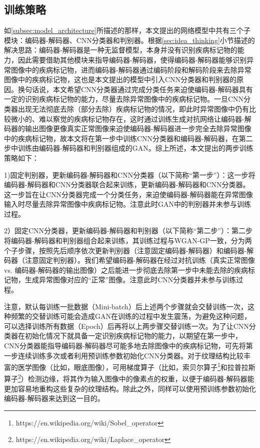 \subsection{训练策略}\label{subsec:traing_stragies}
如\ref{subsec:model_architecture}所描述的那样，本文提出的网络模型中共有三个子模块：编码器-解码器、CNN分类器和判别器。根据\ref{sec:idea_thinking}小节描述的解决思路：编码器-解码器是一种无监督模型，本身并没有识别疾病标记物的能力，因此需要借助其他模块来指导编码器-解码器，使得编码器-解码器能够识别异常图像中的疾病标记物，进而编码器-解码器通过编码阶段和解码阶段来去除异常图像中的疾病标记物，这也是本文提出的模型中引入CNN分类器和判别器的原因。换句话说，本文希望CNN分类器通过完成分类任务来迫使编码器-解码器具有一定的识别疾病标记物的能力，尽量去除异常图像中的疾病标记物。一旦CNN分类器出现无法彻底去除（部分去除）疾病标记物的情况，即此时异常图像中仍有比较微小的、难以察觉的疾病标记物存在，这时通过训练生成对抗网络让编码器-解码器的输出图像更像真实正常图像来迫使编码器-解码器进一步完全去除异常图像中的疾病标记物，故本文将在第一步中训练CNN分类器和编码器-解码器，在第二步中训练由编码器-解码器和判别器组成的GAN。综上所述，本文提出的两步训练策略如下：

1)固定判别器，更新编码器-解码器和CNN分类器（以下简称“第一步”）：这一步将编码器-解码器和CNN分类器联合起来训练，更新编码器-解码器和CNN分类器。这一步旨在让CNN分类器完成一个分类任务，来迫使编码器-解码器能在异常图像输入时尽量去除异常图像中疾病标记物。注意此时GAN中的判别器并未参与训练过程。

2）固定CNN分类器，更新编码器-解码器和判别器（以下简称“第二步”）：第二步将编码器-解码器和判别器组合起来训练，其训练过程与WGAN-GP一致，分为两个子步骤，按照先后顺序依次更新判别器（注意固定编码器-解码器）和编码器-解码器（注意固定判别器）。我们希望编码器-解码器在经过对抗训练（真实正常图像 vs. 编码器-解码器的输出图像）之后能进一步彻底去除第一步中未能去除的疾病标记物，生成异常图像对应的“正常”图像。注意此时CNN分类器并未参与训练过程。

注意，默认每训练一批数据（Mini-batch）后上述两个步骤就会交替训练一次，这种频繁的交替训练可能会造成GAN在训练的过程中发生震荡，为避免这种问题，可以选择训练所有数据（Epoch）后再将以上两步骤交替训练一次。为了让CNN分类器在初始化情况下就具备一定识别疾病标记物的能力，以期望在第一步中，CNN分类器能指导编码器-解码器尽可能多地去除图像中的疾病标记物，可先将第一步连续训练多次或者利用预训练参数初始化CNN分类器。对于纹理结构比较丰富的医学图像（比如，眼底图像），可用梯度算子（比如，索贝尔算子\footnote{https://en.wikipedia.org/wiki/Sobel\_operator}和拉普拉斯算子\footnote{https://en.wikipedia.org/wiki/Laplace\_operator}）检测边缘，将其作为输入图像中的像素点的权重，以便于编码器-解码器能更加容易地重构这些复杂的纹理结构。除此之外，同样可以使用预训练参数初始化编码器-解码器来达到这一目的。

